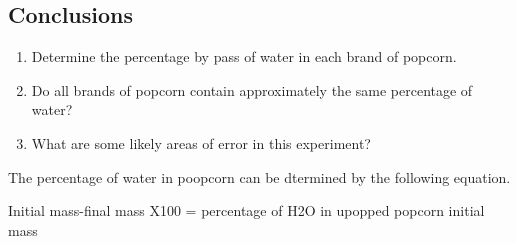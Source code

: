 \documentclass[12pt]{article}
\begin{document}
\subsection{Conclusions}

\begin{enumerate}
  \item Determine the percentage by pass of water in each brand of popcorn.
  \item Do all brands of popcorn contain approximately the same percentage of water?
  \item What are some likely areas of error in this experiment?
\end{enumerate}

The percentage of water in poopcorn can be dtermined by the following equation.

Initial mass-final mass X100 = percentage of H2O in upopped popcorn initial mass
\end{document}
